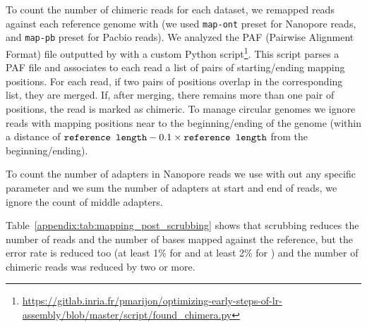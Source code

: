 \documentclass[../../main.tex]{subfiles}
\begin{document}
To count the number of chimeric reads for each dataset, we remapped reads against each reference genome with \minimap (we used \texttt{map-ont} preset for Nanopore reads, and \texttt{map-pb} preset for Pacbio reads). We analyzed the PAF (Pairwise Alignment Format) file outputted by \minimap with a custom Python script\footnote{\url{https://gitlab.inria.fr/pmarijon/optimizing-early-steps-of-lr-assembly/blob/master/script/found_chimera.py}}. This script parses a PAF file and associates to each read a list of pairs of starting/ending mapping positions. For each read, if two pairs of positions overlap in the corresponding list, they are merged. If, after merging, there remains more than one pair of positions, the read is marked as chimeric. To manage circular genomes we ignore reads with mapping positions near to the beginning/ending of the genome (within a distance of $\mbox{\texttt{reference length}} - 0.1 \times \mbox{\texttt{reference length}}$ from the beginning/ending).

To count the number of adapters in Nanopore reads we use  \cite{porechop} with out any specific parameter and we sum the number of adapters at start and end of reads, we ignore the count of middle adapters.

Table~\ref{appendix:tab:mapping_post_scrubbing} shows that scrubbing reduces the number of reads and the number of bases mapped against the reference, but the error rate is reduced too (at least 1\% for \yacrd and at least 2\% for \dascrubber) and the number of chimeric reads was reduced by two or more.
 
\end{document}
